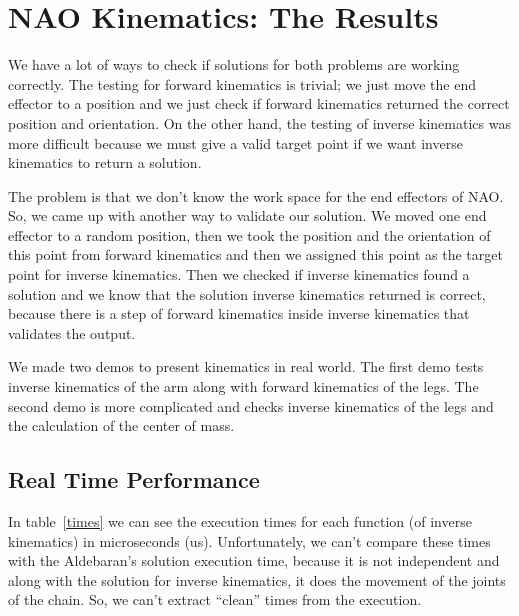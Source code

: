\chapter{NAO Kinematics: The Results}
\label{Results}
We have a lot of ways to check if solutions for both problems are working correctly. The testing for forward kinematics is trivial; we just move the end effector to a position and we just check if forward kinematics returned the correct position and orientation. On the other hand, the testing of inverse kinematics was more difficult because we must give a valid target point if we want inverse kinematics to return a solution.

The problem is that we don't know the work space for the end effectors of NAO. So, we came up with another way to validate our solution. We moved one end effector to a random position, then we took the position and the orientation of this point from forward kinematics and then we assigned this point as the target point for inverse kinematics. Then we checked if inverse kinematics found a solution and we know that the solution inverse kinematics returned is correct, because there is a step of forward kinematics inside inverse kinematics that validates the output.

We made two demos to present kinematics in real world. The first demo tests inverse kinematics of the arm along with forward kinematics of the legs. The second demo is more complicated and checks inverse kinematics of the legs and the calculation of the center of mass.


\section{Real Time Performance}
In table~\ref{times} we can see the execution times for each function (of inverse kinematics) in microseconds (us). Unfortunately, we can't compare these times with the Aldebaran's solution execution time, because it is not independent and along with the solution for inverse kinematics, it does the movement of the joints of the chain. So, we can't extract ``clean'' times from the execution.

